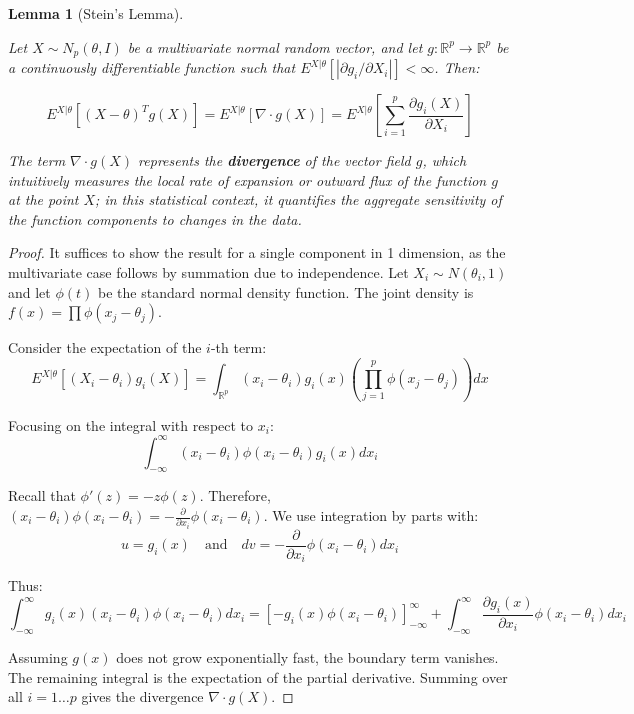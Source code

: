 \documentclass[
  letterpaper,
  DIV=11,
  numbers=noendperiod]{scrreprt}
\renewcommand{\[}{\begin{equation}}
\renewcommand{\]}{\end{equation}}
\theoremstyle{definition}
\theoremstyle{plain}
\theoremstyle{plain}
\theoremstyle{plain}
\theoremstyle{definition}
\theoremstyle{plain}
\newtheorem{lemma}{Lemma}[chapter]
\theoremstyle{remark}
\begin{document}
\begin{lemma}[Stein's
Lemma]\protect\hypertarget{lem-stein}{}\label{lem-stein}

Let \(X \sim N_p(\theta, I)\) be a multivariate normal random vector,
and let \(g: \mathbb{R}^p \to \mathbb{R}^p\) be a continuously
differentiable function such that
\(E^{X|\theta}[| \partial g_i / \partial X_i |] < \infty\). Then:

\[
E^{X|\theta} \left[ (X - \theta)^T g(X) \right] = E^{X|\theta} \left[ \nabla \cdot g(X) \right] = E^{X|\theta} \left[ \sum_{i=1}^p \frac{\partial g_i(X)}{\partial X_i} \right]
\]

The term \(\nabla \cdot g(X)\) represents the \textbf{divergence} of the
vector field \(g\), which intuitively measures the local rate of
expansion or outward flux of the function \(g\) at the point \(X\); in
this statistical context, it quantifies the aggregate sensitivity of the
function components to changes in the data.

\end{lemma}

\begin{proof}
\leavevmode

It suffices to show the result for a single component in 1 dimension, as
the multivariate case follows by summation due to independence. Let
\(X_i \sim N(\theta_i, 1)\) and let \(\phi(t)\) be the standard normal
density function. The joint density is
\(f(x) = \prod \phi(x_j - \theta_j)\).

Consider the expectation of the \(i\)-th term: \[
E^{X|\theta} [ (X_i - \theta_i) g_i(X) ] = \int_{\mathbb{R}^p} (x_i - \theta_i) g_i(x) \left( \prod_{j=1}^p \phi(x_j - \theta_j) \right) dx
\]

Focusing on the integral with respect to \(x_i\): \[
\int_{-\infty}^{\infty} (x_i - \theta_i) \phi(x_i - \theta_i) g_i(x) dx_i
\]

Recall that \(\phi'(z) = -z \phi(z)\). Therefore,
\((x_i - \theta_i) \phi(x_i - \theta_i) = - \frac{\partial}{\partial x_i} \phi(x_i - \theta_i)\).
We use integration by parts with: \[
u = g_i(x) \quad \text{and} \quad dv = - \frac{\partial}{\partial x_i} \phi(x_i - \theta_i) dx_i
\]

Thus: \[
\int_{-\infty}^{\infty} g_i(x) (x_i - \theta_i) \phi(x_i - \theta_i) dx_i = \left[ -g_i(x) \phi(x_i - \theta_i) \right]_{-\infty}^{\infty} + \int_{-\infty}^{\infty} \frac{\partial g_i(x)}{\partial x_i} \phi(x_i - \theta_i) dx_i
\]

Assuming \(g(x)\) does not grow exponentially fast, the boundary term
vanishes. The remaining integral is the expectation of the partial
derivative. Summing over all \(i=1 \dots p\) gives the divergence
\(\nabla \cdot g(X)\).

\end{proof}
\end{document}
